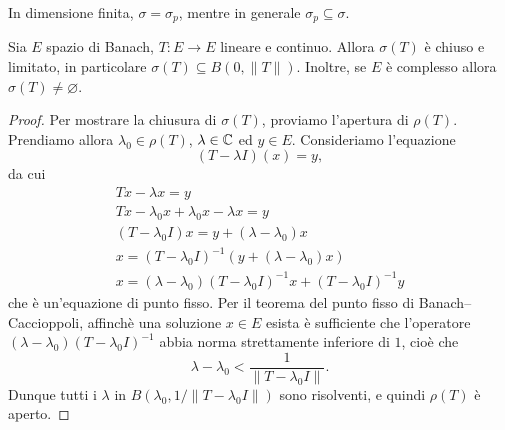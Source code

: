 \begin{remark}
	In dimensione finita, $\sigma = \sigma_p$, mentre in generale $\sigma_p \subseteq \sigma$.
\end{remark}

\begin{theorem}
\label{th:ops_five}
	Sia $E$ spazio di Banach, $T:E \to E$ lineare e continuo.
	Allora $\sigma(T)$ è chiuso e limitato, in particolare $\sigma(T) \subseteq B(0,\|T\|)$.
	Inoltre, se $E$ è complesso allora $\sigma(T) \neq \varnothing$.
\end{theorem}
\begin{proof}
	Per mostrare la chiusura di $\sigma(T)$, proviamo l'apertura di $\rho(T)$.
	Prendiamo allora $\lambda_0 \in \rho(T)$, $\lambda \in \mathbb{C}$ ed $y \in E$. Consideriamo l'equazione
	\begin{equation*}
		(T-\lambda I)(x) = y,
	\end{equation*}
	da cui
	\begin{gather*}
		Tx - \lambda x = y\\
		Tx - \lambda_0 x + \lambda_0 x - \lambda x = y\\
		(T-\lambda_0 I)x = y + (\lambda - \lambda_0) x\\
		x = (T-\lambda_0 I)^{-1}(y + (\lambda - \lambda_0)x)\\
		x = (\lambda - \lambda_0)(T-\lambda_0 I)^{-1}x + (T-\lambda_0 I)^{-1} y
	\end{gather*}
	che è un'equazione di punto fisso. Per il teorema del punto fisso di Banach--Caccioppoli\footnotemark, affinchè una soluzione $x \in E$ esista è sufficiente che l'operatore $(\lambda - \lambda_0)(T-\lambda_0I)^{-1}$ abbia norma strettamente inferiore di $1$, cioè che
	\begin{equation*}
		\lambda - \lambda_0 < \frac1{\|T-\lambda_0I\|}.
	\end{equation*}
	Dunque tutti i $\lambda$ in $B(\lambda_0, 1/\|T-\lambda_0I\|)$ sono risolventi, e quindi $\rho(T)$ è aperto.



\end{proof}
